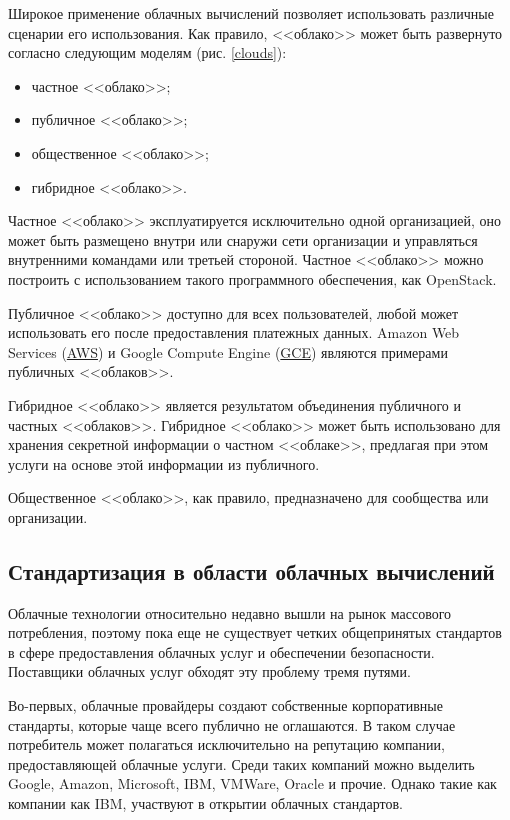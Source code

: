 Широкое применение облачных вычислений позволяет использовать различные сценарии его использования.
Как правило, <<облако>> может быть развернуто согласно следующим моделям (рис. \ref{clouds}):
\begin{itemize}
  \item частное <<облако>>;
  \item публичное <<облако>>;
  \item общественное <<облако>>;
  \item гибридное <<облако>>.
\end{itemize}


Частное <<облако>> эксплуатируется исключительно одной организацией, оно может быть размещено внутри или снаружи сети организации и управляться внутренними командами или третьей стороной.
Частное <<облако>> можно построить с использованием такого программного обеспечения, как OpenStack.

Публичное <<облако>> доступно для всех пользователей, любой может использовать его после предоставления платежных данных.
Amazon Web Services (\hyperlink{aws}{AWS}) и Google Compute Engine (\hyperlink{gce}{GCE}) являются примерами публичных <<облаков>>.

Гибридное <<облако>> является результатом объединения публичного и частных <<облаков>>.
Гибридное <<облако>> может быть использовано для хранения секретной информации о частном <<облаке>>, предлагая при этом услуги на основе этой информации из публичного.

Общественное <<облако>>, как правило, предназначено для сообщества или организации.

\subsection{Стандартизация в области облачных вычислений}

Облачные технологии относительно недавно вышли на рынок массового потребления, поэтому пока еще не существует четких общепринятых стандартов в сфере предоставления облачных услуг и обеспечении безопасности.
Поставщики облачных услуг обходят эту проблему тремя путями.

Во-первых, облачные провайдеры создают собственные корпоративные стандарты, которые чаще всего публично не оглашаются.
В таком случае потребитель может полагаться исключительно на репутацию компании, предоставляющей облачные услуги.
Среди таких компаний можно выделить Google, Amazon, Microsoft, IBM, VMWare, Oracle и прочие.
Однако такие как компании как IBM, участвуют в открытии облачных стандартов.

